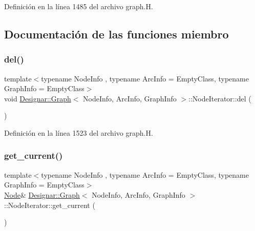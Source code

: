 Definición en la línea 1485 del archivo graph.\+H.



\subsection{Documentación de las funciones miembro}
\mbox{\label{class_designar_1_1_graph_1_1_node_iterator_a8ff7d2de6b10d3fd60774db675340259}} 
\subsubsection{\texorpdfstring{del()}{del()}}
{\footnotesize\ttfamily template$<$typename Node\+Info , typename Arc\+Info  = Empty\+Class, typename Graph\+Info  = Empty\+Class$>$ \\
void \hyperlink{class_designar_1_1_graph}{Designar\+::\+Graph}$<$ Node\+Info, Arc\+Info, Graph\+Info $>$\+::Node\+Iterator\+::del (\begin{DoxyParamCaption}{ }\end{DoxyParamCaption})\hspace{0.3cm}{\ttfamily [inline]}}



Definición en la línea 1523 del archivo graph.\+H.

\mbox{\label{class_designar_1_1_graph_1_1_node_iterator_a79268477058bf2d213dc11581c12a125}} 
\subsubsection{\texorpdfstring{get\+\_\+current()}{get\_current()}\hspace{0.1cm}{\footnotesize\ttfamily [1/2]}}
{\footnotesize\ttfamily template$<$typename Node\+Info , typename Arc\+Info  = Empty\+Class, typename Graph\+Info  = Empty\+Class$>$ \\
\hyperlink{class_designar_1_1_graph_a5dfc7dba9d092ac489c72e40390c37d0}{Node}\& \hyperlink{class_designar_1_1_graph}{Designar\+::\+Graph}$<$ Node\+Info, Arc\+Info, Graph\+Info $>$\+::Node\+Iterator\+::get\+\_\+current (\begin{DoxyParamCaption}{ }\end{DoxyParamCaption})\hspace{0.3cm}{\ttfamily [inline]}}



